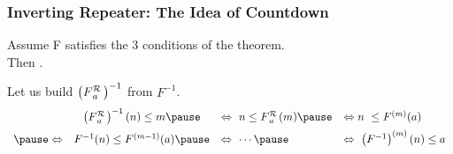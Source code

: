 \begin{frame}
\frametitle{Inverting Repeater: The Idea of Countdown}

Assume F satisfies the 3 conditions of the theorem. \\ \smallskip
Then .

\smallskip

Let us build $\left(\rf{F}{a}\ \right)^{-1}$ from $F^{-1}$.
\pause
	\begin{equation*}
	\displayindent0pt
	\displaywidth\textwidth
	\begin{array}{ccll}
	& \left(\rf{F}{a}\ \right)^{-1}(n)\le m \pause & \iff \ n \le \rf{F}{a}\ (m) \pause & \iff n \ \le F^{(m)}(a) \\[5pt]
  \pause \iff & F^{-1}(n)\le F^{(m-1)}(a) \pause & \iff \ \cdots \pause &
	\iff \ \left(F^{-1}\right)^{(m)}(n) \le a 
	\end{array}
	\end{equation*}

\pause
{}

\end{frame}


%
%
%
%
%
%
%


